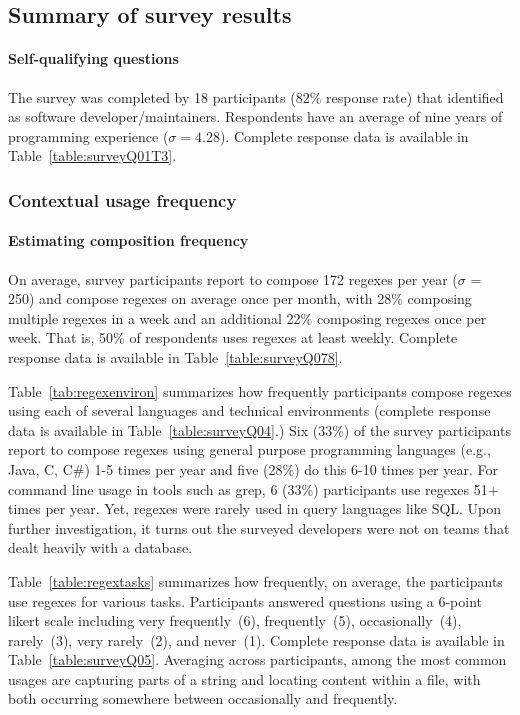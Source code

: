\subsection{Summary of survey results}
\label{sec:surveyResults}

\paragraph{Self-qualifying questions} The survey was completed by 18 participants (82\% response rate) that identified as software developer/maintainers.  Respondents have an average of nine years of programming experience ($\sigma = 4.28$).  Complete response data is available in Table~\ref{table:surveyQ01T3}.

\subsubsection{Contextual usage frequency}
\paragraph{Estimating composition frequency}\label{sec:compositionFrequency} On average, survey participants report to compose 172 regexes per year ($\sigma$ = 250) and compose regexes on average once per month, with 28\% composing multiple regexes in a week and an additional 22\% composing regexes once per week. That is, 50\% of respondents uses regexes at least weekly.  Complete response data is available in Table~\ref{table:surveyQ078}.



Table~\ref{tab:regexenviron} summarizes how frequently participants compose regexes using each of several languages and technical environments (complete response data is available in Table~\ref{table:surveyQ04}.)  Six (33\%) of the survey participants report to compose regexes using general purpose programming languages (e.g., Java, C, C\#) 1-5 times per year and five (28\%) do this 6-10 times per year.  For command line usage in tools such as grep, 6 (33\%) participants use regexes 51+ times per year. Yet, regexes were rarely used in query languages like SQL. Upon further investigation, it turns out the surveyed developers were not on teams that dealt heavily with a database.



Table~\ref{table:regextasks} summarizes how frequently, on average, the participants use
regexes for various tasks.
Participants answered questions using a 6-point likert scale including very frequently~(6), frequently~(5), occasionally~(4), rarely~(3), very rarely~(2), and never~(1).  Complete response data is available in Table~\ref{table:surveyQ05}.  Averaging across participants, among the most common usages are capturing parts of a string and locating content within a file, with both occurring somewhere between occasionally and frequently.

